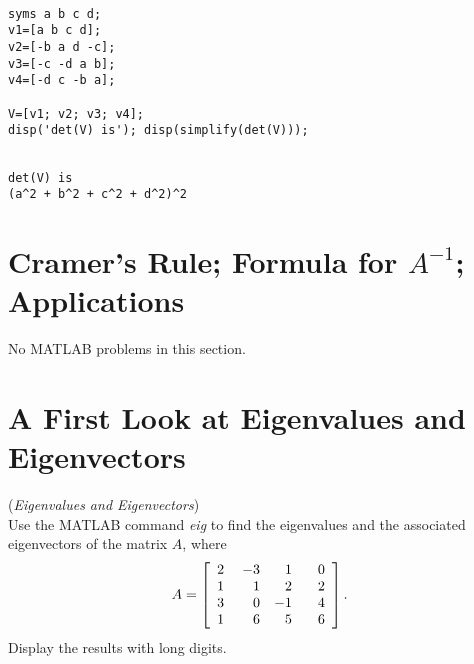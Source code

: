 \begin{sol}

\begin{verbatim}

syms a b c d;
v1=[a b c d];
v2=[-b a d -c];
v3=[-c -d a b];
v4=[-d c -b a];

V=[v1; v2; v3; v4];
disp('det(V) is'); disp(simplify(det(V)));
\end{verbatim}

\begin{outputs}
\begin{verbatim}

det(V) is
(a^2 + b^2 + c^2 + d^2)^2
\end{verbatim}

\end{outputs}

\end{sol}


\section{Cramer's Rule; Formula for $A^{-1}$; Applications}

No MATLAB problems in this section.

\newpage

\section{A First Look at Eigenvalues and Eigenvectors}


\begin{exer}(\textit{Eigenvalues and Eigenvectors})\\
Use the MATLAB command \textit{eig} to find the eigenvalues and the associated \mbox{eigenvectors} of the matrix $A$, where
$$A = \left[\begin{array}{rrrr} 2& \hspace{1mm}-3& \hspace{1mm} 1& \hspace{3mm} 0\\ 1 & 1 & 2 & 2\\ 3 & 0 & -1 & 4 \\ 1 & 6 & 5 & 6 \end{array} \right].$$
Display the results with long digits.
\end{exer}

